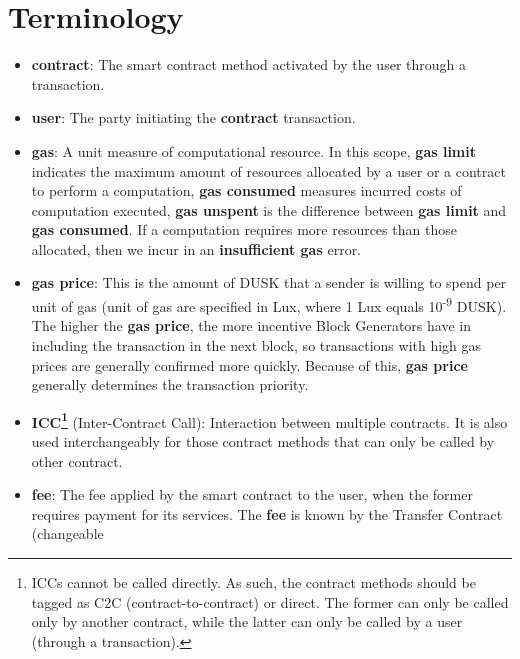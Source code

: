 \documentclass[twocolumn, nofootinbib]{revtex4-2}
\begin{document}
    \section{Terminology}\label{sec:terminology}
    \begin{itemize}
        \item \textbf{contract}: The smart contract method activated by the user
              through a transaction.
        \item \textbf{user}: The party initiating the \textbf{contract} transaction.
        \item \textbf{gas}: A unit measure of computational resource.
              In this scope, \textbf{gas limit} indicates the maximum amount of
              resources allocated by a user or a contract to perform a
              computation, \textbf{gas consumed} measures incurred costs of
              computation executed, \textbf{gas unspent} is the difference
              between \textbf{gas limit} and \textbf{gas consumed}.
              If a computation requires more resources than those allocated,
              then we incur in an \textbf{insufficient gas} error.
        \item \textbf{gas price}: This is the amount of DUSK that a sender is
              willing to spend per unit of gas (unit of gas are specified in
              Lux, where 1 Lux equals 10\textsuperscript{-9} DUSK). The higher
              the \textbf{gas price}, the more incentive Block Generators have
              in including the transaction in the next block, so transactions
              with high gas prices are generally confirmed more quickly.
              Because of this, \textbf{gas price} generally determines the
              transaction priority.
        \item \textbf{ICC\footnote{ICCs cannot be called directly. As such, the
              contract methods should be tagged as C2C (contract-to-contract) or
              direct. The former can only be called only by another contract,
              while the latter can only be called by a user (through a
              transaction).}} (Inter-Contract Call): Interaction between
              multiple contracts.
              It is also used interchangeably for those contract methods that
              can only be called by other contract.
        \item \textbf{fee}: The fee applied by the smart contract to the user, when the
              former requires payment for its services.
              The \textbf{fee} is known by the Transfer Contract (changeable

\end{itemize}
\end{document}
